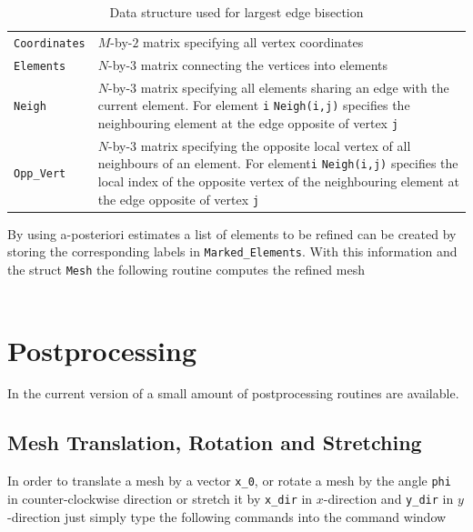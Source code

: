 \begin{table}[htb]
  \begin{tabular}{p{2cm}p{9cm}}
    {\tt Coordinates} & \small $M$-by-$2$ matrix specifying all vertex coordinates            \\
    {\tt Elements}    & \small $N$-by-$3$ matrix connecting the vertices into elements        \\
    {\tt Neigh}       & \small $N$-by-$3$ matrix specifying all elements sharing an edge
                        with the current element. For element {\tt i} {\tt Neigh(i,j)}
                        specifies the neighbouring element at the edge opposite of
                        vertex {\tt j}                                                        \\
    {\tt Opp\_Vert}   & \small $N$-by-$3$ matrix specifying the opposite local vertex of all
                        neighbours of an element. For element{\tt i} {\tt Neigh(i,j)}
                        specifies the local index of the opposite vertex of the
                        neighbouring element at the edge opposite of vertex {\tt j}
  \end{tabular}
  \caption{Data structure used for largest edge bisection}
  \label{tab:MSH_LEB}
\end{table}

 By using a-posteriori estimates a list of elements to be refined can be created by storing the corresponding labels in {\tt Marked\_Elements}. With this information and the struct {\tt Mesh} the following routine computes the refined mesh\\

 \\

\section{Postprocessing} 

 In the current version of \LIBNAME a small amount of postprocessing routines are available.

\subsection{Mesh Translation, Rotation and Stretching}

 In order to translate a mesh by a vector {\tt x\_0}, or rotate a mesh by the angle {\tt phi} in counter-clockwise direction or stretch it by {\tt x\_dir} in $x$-direction and {\tt y\_dir} in $y$-direction just simply type the following commands into the \MATLAB command window \\

